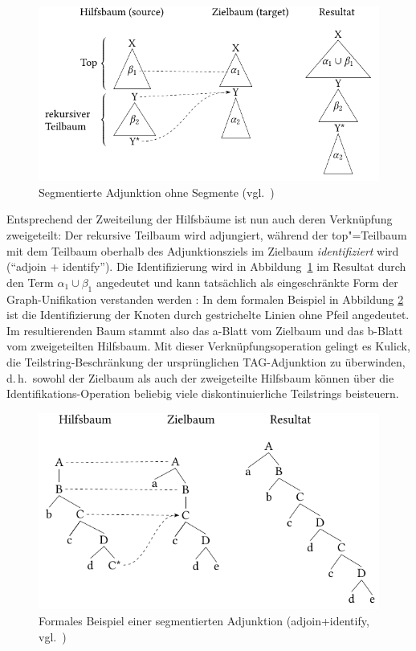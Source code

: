 \begin{figure}[t]
\centering
\includegraphics{graphics/abb611.pdf}
\caption{Segmentierte Adjunktion ohne Segmente (vgl.\ \citealt[Fig.~6.1]{Kulick:00})\label{fig-segmented-adj}}
\end{figure}

Entsprechend der Zweiteilung der Hilfsbäume ist nun auch deren Verknüpfung zweigeteilt: Der rekursive Teilbaum wird adjungiert, während der top"=Teilbaum mit dem Teilbaum oberhalb des Adjunktionsziels im Zielbaum {\it identifiziert}  wird ("`adjoin + identify"'). Die Identifizierung wird in Abbildung~\ref{fig-segmented-adj} im Resultat durch den Term $\alpha_1 \cup \beta_1$ angedeutet und kann tatsächlich als eingeschränkte Form der Graph-Unifikation verstanden werden \citep[93f]{Kulick:00}: In dem formalen Beispiel in Abbildung \ref{fig-seg-formal} ist die Identifizierung der Knoten durch gestrichelte Linien ohne Pfeil angedeutet. Im resultierenden Baum stammt also das a-Blatt vom Zielbaum und das b-Blatt vom zweigeteilten Hilfsbaum. Mit dieser Verknüpfungsoperation gelingt es Kulick, die Teilstring-Beschränkung der ursprünglichen TAG-Adjunktion zu überwinden, d.\,h.\ sowohl der Zielbaum als auch der zweigeteilte Hilfsbaum können über die Identifikations-Operation beliebig viele diskontinuierliche Teilstrings beisteuern. 

\begin{figure}[t] 
\centering
\includegraphics{graphics/abb612.pdf}
\caption{Formales Beispiel einer segmentierten Adjunktion (adjoin+identify, vgl.\ \citealt[(145), (146)]{Kulick:00})\label{fig-seg-formal}}
\end{figure} 
 
